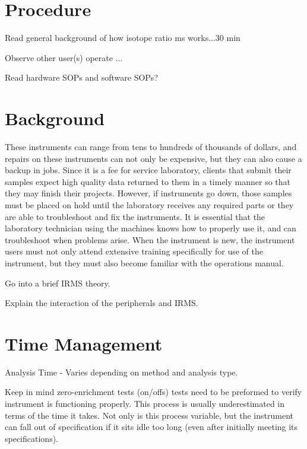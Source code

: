 \documentclass[12pt]{../SOP3_beta}\usepackage[]{graphicx}\usepackage[]{color}
\begin{document}
\NP


\section{Procedure}

\NP Read general background of how isotope ratio ms works...30 min

\NP Observe other user(s) operate ...

\NP Read hardware SOPs and software SOPs?

\section{Background}

These instruments can range from tens to hundreds of thousands of dollars, and repairs on these instruments can not only be expensive, but they can also cause a backup in jobs. Since it is a fee for service laboratory, clients that submit their samples expect high quality data returned to them in a timely manner so that they may finish their projects. However, if instruments go down, those samples must be placed on hold until the laboratory receives any required parts or they are able to troubleshoot and fix the instruments. It is essential that the laboratory technician using the machines knows how to properly use it, and can troubleshoot when problems arise. When the instrument is new, the instrument users must not only attend extensive training specifically for use of the instrument, but they must also become familiar with the operations manual.

Go into a brief IRMS theory.

Explain the interaction of the peripherals and IRMS.

\section{Time Management}

\NP Analysis Time - Varies depending on method and analysis type. 

\NP Keep in mind zero-enrichment tests (on/offs) tests need to be preformed to verify instrument is functioning properly. This process is usually underestimated in terms of the time it takes. Not only is this process variable, but the instrument can fall out of specification if it sits idle too long (even after initially meeting its specifications).
\end{document}
